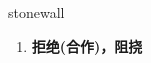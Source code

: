
\begin{frame}
{\huge stonewall}
\begin{center}
\begin{enumerate}\Large
  \item \textbf{拒绝(合作)，阻挠}
\end{enumerate}
\end{center}
\end{frame}
